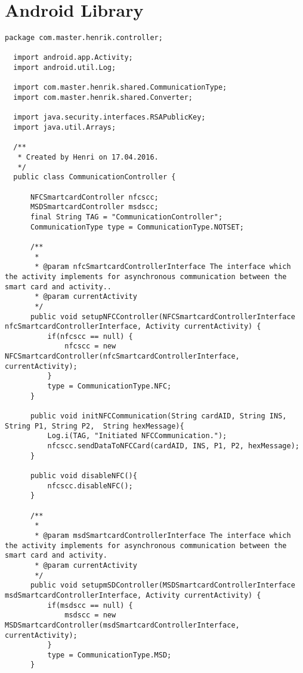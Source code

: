\chapter{Android Library}
\label{app:b}
\begin{lstlisting}[caption=CommunicationController.java.,breaklines=true,breakatwhitespace=false, label=lst:CommunicationController,escapechar=å]
  package com.master.henrik.controller;

  import android.app.Activity;
  import android.util.Log;

  import com.master.henrik.shared.CommunicationType;
  import com.master.henrik.shared.Converter;

  import java.security.interfaces.RSAPublicKey;
  import java.util.Arrays;

  /**
   * Created by Henri on 17.04.2016.
   */
  public class CommunicationController {

      NFCSmartcardController nfcscc;
      MSDSmartcardController msdscc;
      final String TAG = "CommunicationController";
      CommunicationType type = CommunicationType.NOTSET;

      /**
       *
       * @param nfcSmartcardControllerInterface The interface which the activity implements for asynchronous communication between the smart card and activity..
       * @param currentActivity
       */
      public void setupNFCController(NFCSmartcardControllerInterface nfcSmartcardControllerInterface, Activity currentActivity) {
          if(nfcscc == null) {
              nfcscc = new NFCSmartcardController(nfcSmartcardControllerInterface, currentActivity);
          }
          type = CommunicationType.NFC;
      }

      public void initNFCCommunication(String cardAID, String INS, String P1, String P2,  String hexMessage){
          Log.i(TAG, "Initiated NFCCommunication.");
          nfcscc.sendDataToNFCCard(cardAID, INS, P1, P2, hexMessage);
      }

      public void disableNFC(){
          nfcscc.disableNFC();
      }

      /**
       *
       * @param msdSmartcardControllerInterface The interface which the activity implements for asynchronous communication between the smart card and activity.
       * @param currentActivity
       */
      public void setupmSDController(MSDSmartcardControllerInterface msdSmartcardControllerInterface, Activity currentActivity) {
          if(msdscc == null) {
              msdscc = new MSDSmartcardController(msdSmartcardControllerInterface, currentActivity);
          }
          type = CommunicationType.MSD;
      }


\end{lstlisting}
